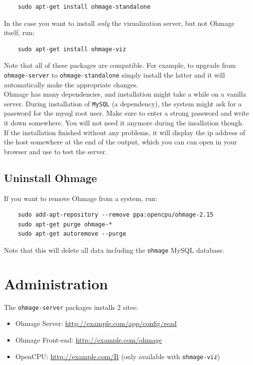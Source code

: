\documentclass{scrartcl}
\begin{document}
\begin{verbatim}
    sudo apt-get install ohmage-standalone
\end{verbatim}
In the case you want to install \emph{only} the vizualization server, but not
Ohmage itself, run:
\begin{verbatim}
    sudo apt-get install ohmage-viz
\end{verbatim}
Note that all of these packages are compatible. For example, to upgrade from
\texttt{ohmage-server} to \texttt{ohmage-standalone} simply install the
latter and it will automatically make the appropriate changes. \\

\noindent Ohmage has many dependencies, and installation might take a while on
a vanilla server. During installation of \texttt{MySQL} (a dependency), the
system might ask for a password for the mysql root user. Make sure to enter a strong
password and write it down somewhere. You will not need it anymore during the
insallation though.\\

\noindent If the installation finished without any problems, it will display the
ip address of the host somewhere at the end of the output, which you can can
open in your browser and use to test the server. 

\subsection{Uninstall Ohmage}

If you want to remove Ohmage from a system, run:

\begin{verbatim}
	sudo add-apt-repository --remove ppa:opencpu/ohmage-2.15
    sudo apt-get purge ohmage-*
    sudo apt-get autoremove --purge
\end{verbatim}
Note that this will delete all data including the \texttt{ohmage} MySQL
database.

\section{Administration}

The \texttt{ohmage-server} packages installs 2 sites:

\begin{itemize}
  \item Ohmage Server: \url{http://example.com/app/config/read}
  \item Ohmage Front-end: \url{http://example.com/ohmage}
  \item OpenCPU: \url{http://example.com/R} (only available with
  \texttt{ohmage-viz})
\end{itemize}
\end{document}
